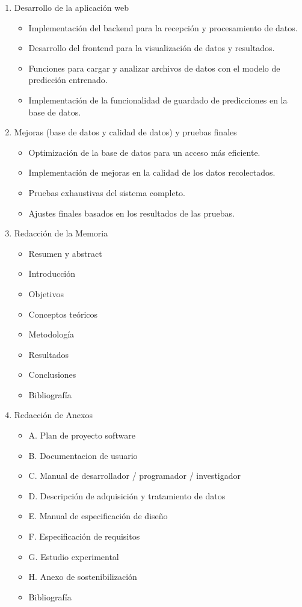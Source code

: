 \begin{enumerate}
    \item Desarrollo de la aplicación web
    \begin{itemize}
        \item Implementación del backend para la recepción y procesamiento de datos.
        \item Desarrollo del frontend para la visualización de datos y resultados.
        \item Funciones para cargar y analizar archivos de datos con el modelo de predicción entrenado.
        \item Implementación de la funcionalidad de guardado de predicciones en la base de datos.
    \end{itemize}

    \item Mejoras (base de datos y calidad de datos) y pruebas finales
    \begin{itemize}
        \item Optimización de la base de datos para un acceso más eficiente.
        \item Implementación de mejoras en la calidad de los datos recolectados.
        \item Pruebas exhaustivas del sistema completo.
        \item Ajustes finales basados en los resultados de las pruebas.
    \end{itemize}

    \item Redacción de la Memoria
    \begin{itemize}
        \item Resumen y abstract
        \item Introducción
        \item Objetivos
        \item Conceptos teóricos
        \item Metodología
        \item Resultados
        \item Conclusiones
        \item Bibliografía
    \end{itemize}

    \item Redacción de Anexos
    \begin{itemize}
        \item A. Plan de proyecto software
        \item B. Documentacion de usuario
        \item C. Manual de desarrollador / programador / investigador
        \item D. Descripción de adquisición y tratamiento de datos
        \item E. Manual de especificación de diseño
        \item F. Especificación de requisitos
        \item G. Estudio experimental
        \item H. Anexo de sostenibilización
        \item Bibliografía
    \end{itemize}
    

\end{enumerate}
